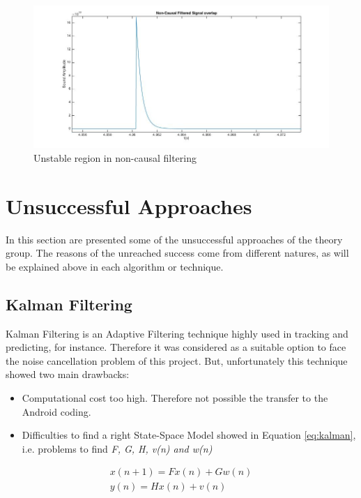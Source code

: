 \documentclass[11pt,a4paper,english]{book}  %
\theoremstyle{definition}  %
\theoremstyle{plain}  %
\theoremstyle{remark}  %
\begin{document}
		\begin{figure}[h]
		\centering
		\includegraphics[width=15cm]{images/theory/noncunstableoverlap.jpg}
		\caption{Unstable region in non-causal filtering}
		\label{fig:noncunstableoverlap}
		\end{figure}		
	


\section{Unsuccessful Approaches}

In this section are presented some of the unsuccessful approaches of the theory group. The reasons of the unreached success come from different natures, as will be explained above in each algorithm or technique.

	\subsection{Kalman Filtering}
	Kalman Filtering is an Adaptive Filtering technique highly used in tracking and predicting, for instance. Therefore it was considered as a suitable option to face the noise cancellation problem of this project. But, unfortunately this technique showed two main drawbacks:
	
	\begin{itemize}
	\item Computational cost too high. Therefore not possible the transfer to the Android coding.
	\item Difficulties to find a right State-Space Model showed in Equation \ref{eq:kalman}, i.e. problems to find \textit{F, G, H, v(n) and w(n)}
	\end{itemize}
	
	
	\begin{subequations}
	\label{eq:kalman}
	\begin{align}
	x(n+1)=Fx(n)+Gw(n)\\
	y(n)=Hx(n)+v(n)	
	\end{align}
	
	\end{subequations}
	
\end{document}
